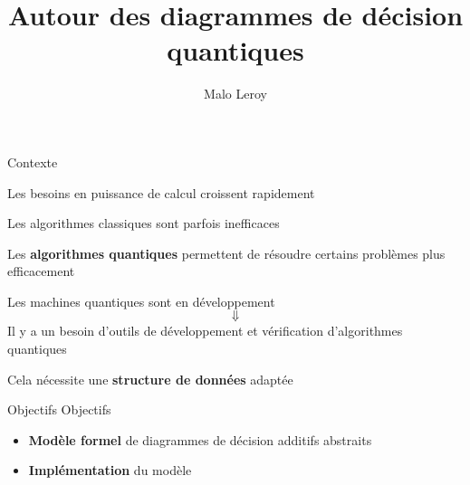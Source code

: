 \documentclass[french, 12pt]{beamer}
\title{Autour des diagrammes de décision quantiques}
\author{Malo Leroy}
\institute{Parcours recherche -- CentraleSupélec}
\begin{document}
\begin{frame}
    \titlepage
\end{frame}

\begin{frame}{Contexte}

\begin{center}
Les besoins en puissance de calcul croissent rapidement


Les algorithmes classiques sont parfois inefficaces

\pause
Les \textbf{algorithmes quantiques} permettent de résoudre certains problèmes plus efficacement
\end{center}
\end{frame}

\begin{frame}
Les machines quantiques sont en développement
$$\Downarrow$$
Il y a un besoin d'outils de développement et vérification d'algorithmes quantiques
\pause

\vspace{1em}
Cela nécessite une \textbf{structure de données} adaptée
\end{frame}



\begin{frame}{Objectifs}
    Objectifs
    \begin{itemize}
        \item \textbf{Modèle formel} de diagrammes de décision additifs abstraits
        \item \textbf{Implémentation} du modèle
    \end{itemize}
\end{frame}
\end{document}
